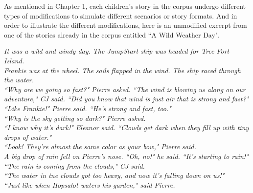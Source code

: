 %
%
%                 

\label{sec:appendixc}

As mentioned in Chapter 1, each children's story in the corpus undergo different types of modifications to simulate different scenarios or story formats. And in order to illustrate the different modifications, here is an unmodified excerpt from one of the stories already in the corpus entitled ``A Wild Weather Day".

	\noindent
	\hspace{1 in}\emph{It was a wild and windy day. The JumpStart ship was headed for Tree Fort Island.} \\
	\hspace*{1 in}\emph{Frankie was at the wheel. The sails flapped in the wind. The ship raced through the water.} \\
	\hspace*{1 in}\emph{``Why are we going so fast?" Pierre asked. ``The wind is blowing us along on our adventure," CJ said. ``Did you know that wind is just air that is strong and fast?"} \\
	\hspace*{1 in}\emph{``Like Frankie!" Pierre said. ``He's strong and fast, too."} \\
	\hspace*{1 in}\emph{``Why is the sky getting so dark?" Pierre asked.}\\
	\hspace*{1 in}\emph{``I know why it's dark!" Eleanor said. ``Clouds get dark when they fill up with tiny drops of water."} \\
	\hspace*{1 in}\emph{``Look! They're almost the same color as your bow," Pierre said.} \\
	\hspace*{1 in}\emph{A big drop of rain fell on Pierre's nose. ``Oh, no!" he said. ``It's starting to rain!"} \\
	\hspace*{1 in}\emph{``The rain is coming from the clouds," CJ said.} \\
	\hspace*{1 in}\emph{``The water in tne clouds got too heavy, and now it's falling down on us!"} \\
	\hspace*{1 in}\emph{``Just like when Hopsalot waters his garden," said Pierre.} \\

